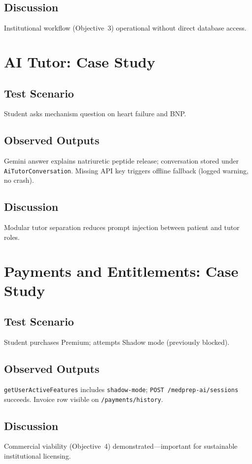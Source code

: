 \subsection{Discussion}
Institutional workflow (Objective~3) operational without direct database access.

\section{AI Tutor: Case Study}
\subsection{Test Scenario}
Student asks mechanism question on heart failure and BNP.

\subsection{Observed Outputs}
Gemini answer explains natriuretic peptide release; conversation stored under \texttt{AiTutorConversation}. Missing API key triggers offline fallback (logged warning, no crash).

\subsection{Discussion}
Modular tutor separation reduces prompt injection between patient and tutor roles.

\section{Payments and Entitlements: Case Study}
\subsection{Test Scenario}
Student purchases Premium; attempts Shadow mode (previously blocked).

\subsection{Observed Outputs}
\texttt{getUserActiveFeatures} includes \texttt{shadow-mode}; \texttt{POST /medprep-ai/sessions} succeeds. Invoice row visible on \texttt{/payments/history}.

\subsection{Discussion}
Commercial viability (Objective~4) demonstrated---important for sustainable institutional licensing.


